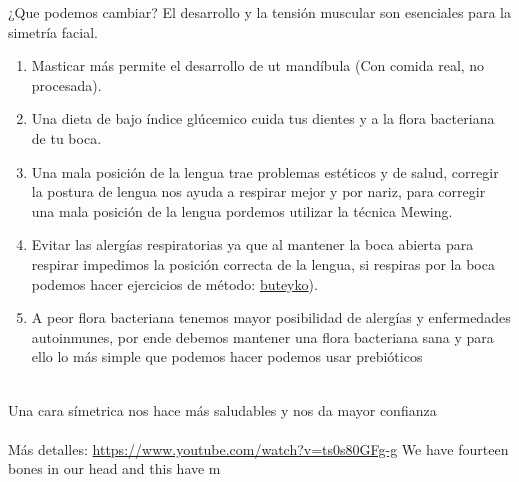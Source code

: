 \documentclass{article}
\begin{document}
¿Que podemos cambiar? El desarrollo y la tensión muscular son esenciales para la simetría facial.
 \begin{enumerate}
     \item Masticar más permite el desarrollo de ut mandíbula (Con comida real, no procesada).
     \item Una dieta de bajo índice glúcemico cuida tus dientes y a la flora bacteriana de tu boca.
     \item Una mala posición de la lengua trae problemas estéticos y de salud, corregir la postura de lengua nos ayuda a respirar mejor y por nariz, para corregir una mala posición de la lengua pordemos utilizar la técnica Mewing.
     
     \item Evitar las alergías respiratorias ya que al mantener la boca abierta para respirar impedimos la posición correcta de la lengua, si respiras por la boca podemos hacer ejercicios de método:  \href{https://www.anahana.com/es/breathing-exercise/buteyko-breathing}{buteyko}).
     \item A peor flora bacteriana tenemos mayor posibilidad de alergías y enfermedades autoinmunes, por ende debemos mantener una flora bacteriana sana y para ello lo más simple que podemos hacer podemos usar prebióticos
 \end{enumerate}\\
Una cara símetrica  nos hace más saludables y nos da mayor confianza\\
\\
Más detalles: \url{https://www.youtube.com/watch?v=ts0s80GFg-g}
We have fourteen bones in our head and this have m
\end{document}
